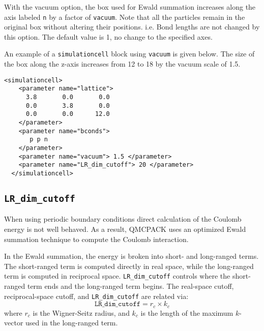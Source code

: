 With the vacuum option, the box used for Ewald summation increases along the axis labeled \texttt{n} by a factor of \texttt{vacuum}.
Note that all the particles remain in the original box without altering their positions. i.e. Bond lengths are not changed by this option.
The default value is 1, no change to the specified axes.

An example of a \texttt{simulationcell} block using \texttt{vacuum} is given below.
The size of the box along the z-axis increases from 12 to 18 by the vacuum scale of 1.5.
\begin{lstlisting}[style=XML]
  <simulationcell>
    <parameter name="lattice">
      3.8       0.0       0.0
      0.0       3.8       0.0
      0.0       0.0      12.0
    </parameter>
    <parameter name="bconds">
       p p n
    </parameter>
    <parameter name="vacuum"> 1.5 </parameter>
    <parameter name="LR_dim_cutoff"> 20 </parameter>
  </simulationcell>
\end{lstlisting}

\subsection{\texttt{LR\_dim\_cutoff}}
When using periodic boundary conditions direct calculation of the Coulomb energy is
not well behaved. As a result, QMCPACK uses an optimized Ewald summation technique
to compute the Coulomb interaction.\cite{Natoli1995}

In the Ewald summation, the energy is broken into short- and long-ranged terms.
The short-ranged term is computed directly in real space, while the long-ranged term is computed in reciprocal space.
\texttt{LR\_dim\_cutoff} controls where the short-ranged term ends and the long-ranged term begins.
The real-space cutoff, reciprocal-space cutoff, and \texttt{LR\_dim\_cutoff} are related via:
\[
\texttt{LR\_dim\_cutoff} = r_{c} \times k_{c}
\]
where $r_{c}$ is the Wigner-Seitz radius, and $k_{c}$ is the length of the maximum $k$-vector used in the long-ranged term.
